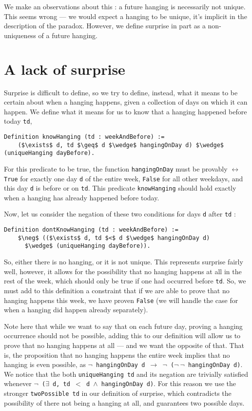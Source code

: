 \documentclass[runningheads]{llncs}
\begin{document}
We make an observations about this : a future hanging is
necessarily not unique. This seems wrong --- we would expect a hanging to be
unique, it's implicit in the description of the paradox. However, we define
surprise in part as a non-uniqueness of a future hanging.

\section{A lack of surprise}
\label{sec:lack}

Surprise is difficult to define, so we try to define, instead, what it means to be certain about
when a hanging happens, given a collection of days on which it can happen.
We define what it means for us to know that a hanging happened before today {\tt td},

\begin{lstlisting}[mathescape=true]
  Definition knowHanging (td : weekAndBefore) :=
    ($\exists$ d, td $\geq$ d $\wedge$ hangingOnDay d) $\wedge$ (uniqueHanging dayBefore).
\end{lstlisting}

For this predicate to be true, the function {\tt hangingOnDay} must be provably $\leftrightarrow$ {\tt True}
for exactly one day {\tt d} of the entire week, {\tt False} for all other weekdays, and this day {\tt d} is
before or on {\tt td}.
This predicate {\tt knowHanging} should hold exactly when a hanging has already happened
before today.

Now, let us consider the negation of these two conditions for days {\tt d} after {\tt td} :

\begin{lstlisting}[mathescape=true]
  Definition dontKnowHanging (td : weekAndBefore) :=
    $\neg$ (($\exists$ d, td $<$ d $\wedge$ hangingOnDay d)
      $\wedge$ (uniqueHanging dayBefore)).
\end{lstlisting}

So, either there is no hanging, or it is not unique. This represents surprise fairly
well, however, it allows for the possibility that no hanging happens at all in the
rest of the week, which should only be true if one had occurred before {\tt td}.
So, we must add to this definition a constraint that if we are able to prove that no
hanging happens this week, we have proven {\tt False} (we will handle the case for when
a hanging did happen already separately).

Note here that while we want to say that on each future day, proving a hanging
occurrence should not be possible, adding this to our definition will allow us to
prove that no hanging happens at all --- and we want the opposite of that.
That is, the proposition that no hanging happens the entire week implies that no
hanging is even possible, as {\tt $\neg$ hangingOnDay d $\to$ $\neg$ ($\neg~\neg$ hangingOnDay d)}.
We notice that the both {\tt uniqueHanging td} and its negation are trivially
satisfied whenever {\tt $\neg$ ($\exists$ d, td $<$ d $\wedge$ hangingOnDay d)}. For this
reason we use the stronger {\tt twoPossible td} in our definition of surprise,
which contradicts the possibility of there not being a hanging at all, and
guarantees two possible days.
\end{document}
